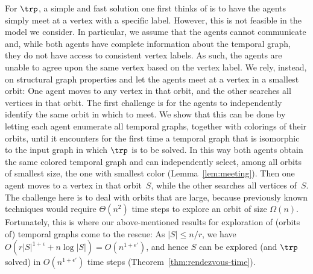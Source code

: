 For $\trp$, a simple and fast solution one first thinks of is to have the agents
simply meet at a vertex with a specific label. {However}, this is not
feasible in the model we consider. In particular, we assume that the agents
cannot communicate %
and, while both agents have complete information about the
temporal graph, they do not have access to consistent vertex labels. As such,
the agents are unable to agree upon the same vertex based on the vertex label.
We rely, instead, on structural graph properties and let the agents meet at a
vertex in a smallest orbit: One agent moves to any vertex in that orbit, and the
other searches all vertices in that orbit. The first challenge is for the agents
to independently identify the same orbit in which to meet. We show that this can
be done by letting each agent enumerate all temporal graphs, together with
colorings of their orbits, until it encounters for the first time a temporal
graph that is isomorphic to the input graph in which $\trp$ is to be solved. In
this way both agents obtain the same colored temporal graph and can
independently select, among all orbits of smallest size, the one with smallest
color (Lemma~\ref{lem:meeting}).
%
Then one agent moves to a vertex in that orbit~$S$, while the other searches all
vertices of~$S$. The challenge here is to deal with orbits that are large,
because previously known techniques would require $\Theta(n^2)$ time steps to
explore an orbit of size $\Omega(n)$. {Fortunately}, this is where our
above-mentioned results for exploration of (orbits of) temporal graphs come to
the rescue: As $|S|\le n/r$, we have $O(r|S|^{1+\epsilon}+n\log
|S|)=O(n^{1+\epsilon'})$, and hence $S$ can be explored (and $\trp$ solved) in
$O(n^{1+\epsilon'})$ time steps (Theorem~\ref{thm:rendezvous-time}).


